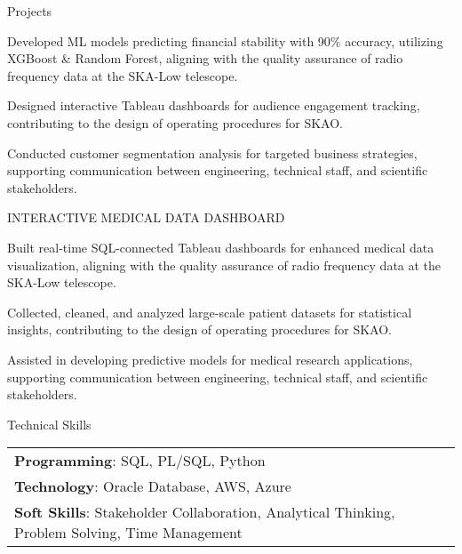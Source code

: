 \documentclass{resume} %
\begin{document}
\begin{rSection}{Projects}
\begin{rSubsection}
                                    \item Developed ML models predicting financial stability with 90\% accuracy, utilizing XGBoost \& Random Forest, aligning with the quality assurance of radio frequency data at the SKA{-}Low telescope.
                                    \item Designed interactive Tableau dashboards for audience engagement tracking, contributing to the design of operating procedures for SKAO.
                                    \item Conducted customer segmentation analysis for targeted business strategies, supporting communication between engineering, technical staff, and scientific stakeholders.
                            \end{rSubsection}
                    \begin{rSubsection}
                                    {INTERACTIVE MEDICAL DATA DASHBOARD}
                                {}{}{}
                                    \item Built real{-}time SQL{-}connected Tableau dashboards for enhanced medical data visualization, aligning with the quality assurance of radio frequency data at the SKA{-}Low telescope.
                                    \item Collected, cleaned, and analyzed large{-}scale patient datasets for statistical insights, contributing to the design of operating procedures for SKAO.
                                    \item Assisted in developing predictive models for medical research applications, supporting communication between engineering, technical staff, and scientific stakeholders.
                            \end{rSubsection}
            \end{rSection}

    \begin{rSection}{Technical Skills}
        \begin{tabular}{ @{} l @{	} l }
                                \textbf{Programming}: SQL, PL/SQL, Python\\
                                \textbf{Technology}: Oracle Database, AWS, Azure\\
                                \textbf{Soft Skills}: Stakeholder Collaboration, Analytical Thinking, Problem Solving, Time Management\\
        \end{tabular}
    \end{rSection}
\end{document}
